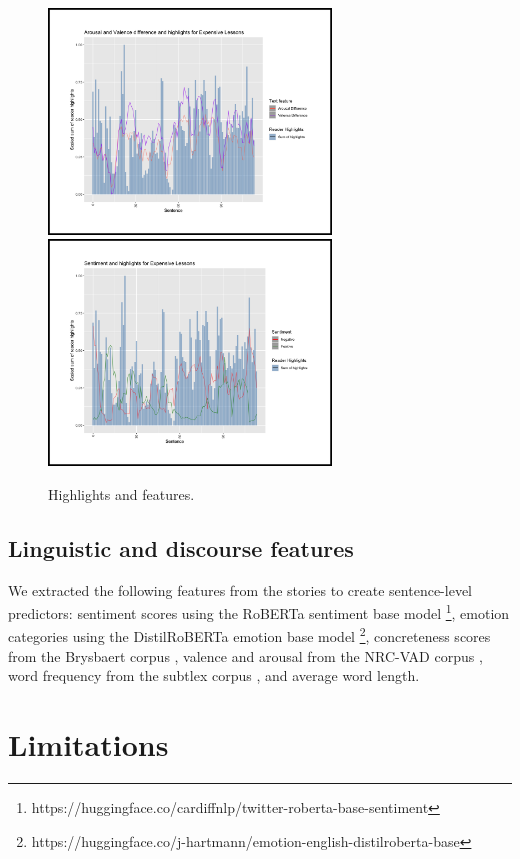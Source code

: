 \documentclass[11pt]{article}
\begin{document}
\begin{figure}[h]
  \includegraphics[height=6cm]{el_highlights_val_arousal}
  \includegraphics[height=6cm]{el_highlights_sentiment}
  \caption{Highlights and features.}
\end{figure}

\subsection{Linguistic and discourse features}

We extracted the following features from the stories to create sentence-level predictors: sentiment scores using the RoBERTa sentiment base model \footnote{https://huggingface.co/cardiffnlp/twitter-roberta-base-sentiment}, emotion categories using the DistilRoBERTa emotion base model \footnote{https://huggingface.co/j-hartmann/emotion-english-distilroberta-base}, concreteness scores from the Brysbaert corpus \citep{brysbaert2014}, valence and arousal from the NRC-VAD corpus \citep{valence_arousal_dominance_2013}, word frequency from the subtlex corpus \citep{Brysbaert_2015}, and average word length.

\section{Limitations}
\end{document}
